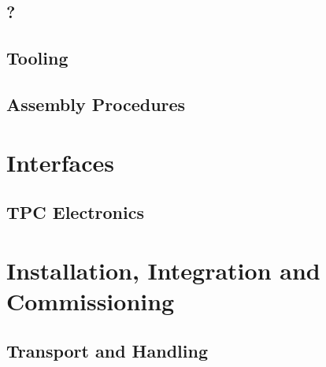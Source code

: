 \subsection{?}
\label{sec:fddp-crp-??}


\subsection{Tooling}
\label{sec:fddp-crp-tooling}


\subsection{Assembly Procedures}
\label{sec:fddp-crp-assy}



\section{Interfaces}
\label{sec:fddp-crp-intfc}



\subsection{TPC Electronics}
\label{sec:fddp-crp-intfc-elec}


\subsection{}
\label{sec:fddp-crp-intfc-?}


\section{Installation, Integration and Commissioning}
\label{sec:fddp-crp-install}

\subsection{Transport and Handling}
\label{sec:fddp-crp-install-transport}


